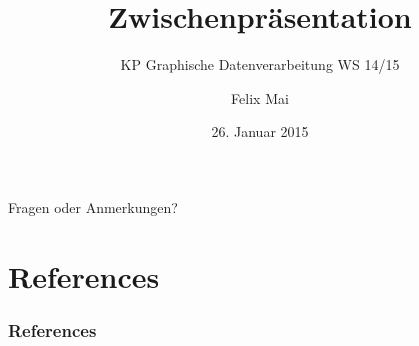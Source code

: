 \documentclass[
	ddcfooter,
	german,
]{tudbeamer}
\title{Zwischenpräsentation}
\subtitle{KP Graphische Datenverarbeitung WS 14/15}
\author{Felix Mai}
\date{26. Januar 2015}
\begin{document}
\maketitle











\begin{frame}[t]
	\vspace*{2.5cm}
	\centerline{\huge{Fragen oder Anmerkungen?}}
\end{frame}


\section*{References}

\begin{frame}[t]
	\frametitle*{References}
	\renewcommand*{\bibfont}{\tiny}
	\nocite{*}
	\printbibliography[title=References]
\end{frame}
\end{document}
